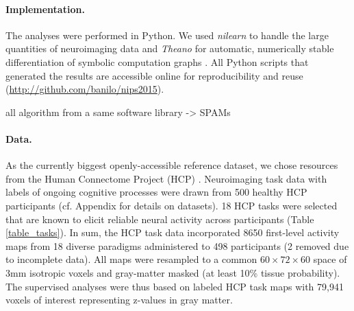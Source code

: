 \documentclass{article}
\begin{document}
\paragraph{Implementation.}
The analyses were performed in Python.
We used \textit{nilearn} to handle
the large quantities of neuroimaging data 
\cite{abrah14}
and
\textit{Theano} for automatic, numerically stable
differentiation of symbolic computation graphs
\cite{bastien2012theano, bergstra2010theano}.
All Python scripts that generated the results are
accessible online for reproducibility and reuse
(\url{http://github.com/banilo/nips2015}).
  

all algorithm from a same software library -> SPAMs

%
\paragraph{Data.}
As the currently biggest openly-accessible reference dataset,
we chose resources from the Human Connectome Project (HCP)
\cite{barch2013}.
Neuroimaging task data with labels of ongoing cognitive processes
were drawn from 500
healthy HCP participants (cf. Appendix for details on datasets).
18 HCP tasks 
were selected that are known to elicit reliable neural activity
across participants (Table \ref{table_tasks}).
In sum, the HCP task data incorporated 8650 first-level activity maps
from 18 diverse paradigms administered to 498 participants (2 removed
due to incomplete data).
All maps were resampled to a common $60\times72\times60$ space of
3mm isotropic voxels and gray-matter masked (at least 10\% tissue
probability).
The supervised analyses were thus based on labeled HCP task maps with
79,941 voxels of interest representing z-values in gray matter.
\end{document}
